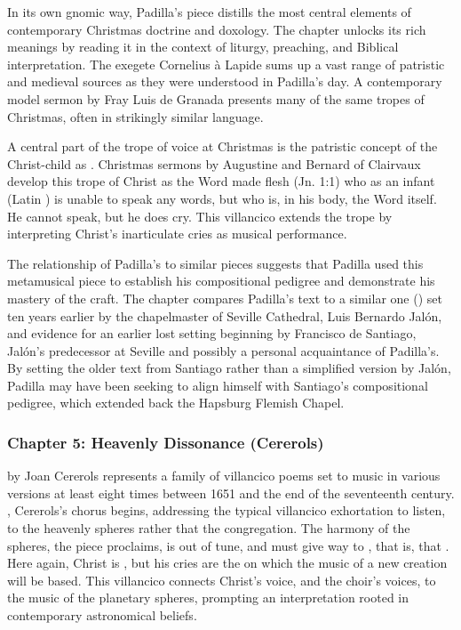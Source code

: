 \documentclass{vcbook-proposal}
\begin{document}
In its own gnomic way, Padilla's piece distills the most central elements of contemporary Christmas doctrine and doxology.
The chapter unlocks its rich meanings by reading it in the context of liturgy, preaching, and Biblical interpretation.
The exegete Cornelius à Lapide sums up a vast range of patristic and medieval sources as they were understood in Padilla's day. 
A contemporary model sermon by Fray Luis de Granada presents many of the same tropes of Christmas, often in strikingly similar language.

A central part of the trope of voice at Christmas is the patristic concept of the Christ-child as . 
Christmas sermons by Augustine and Bernard of Clairvaux develop this trope of Christ as the Word made flesh (Jn. 1:1) who as an infant (Latin ) is unable to speak any words, but who is, in his body, the Word itself.
He cannot speak, but he does cry.
This villancico extends the trope by interpreting Christ's inarticulate cries as musical performance.

The relationship of Padilla's  to similar pieces suggests that Padilla used this metamusical piece to establish his compositional pedigree and demonstrate his mastery of the craft.
The chapter compares Padilla's text to a similar one () set ten years earlier by the chapelmaster of Seville Cathedral, Luis Bernardo Jalón, and evidence for an earlier lost setting beginning  by Francisco de Santiago, Jalón's predecessor at Seville and possibly a personal acquaintance of Padilla's.
By setting the older text from Santiago rather than a simplified version by Jalón, Padilla may have been seeking to align himself with Santiago's compositional pedigree, which extended back the Hapsburg Flemish Chapel.


\subsubsection{Chapter 5: Heavenly Dissonance (Cererols)}

 by Joan Cererols represents a family of villancico poems set to music in various versions at least eight times between 1651 and the end of the seventeenth century.
, Cererols's chorus begins, addressing the typical villancico exhortation to listen, to the heavenly spheres rather that the congregation. 
The harmony of the spheres, the piece proclaims, is out of tune, and must give way to , that is,  that .
Here again, Christ is , but his cries are the  on which the music of a new creation will be based.
This villancico connects Christ's voice, and the choir's voices, to the music of the planetary spheres, prompting an interpretation rooted in contemporary astronomical beliefs.
\end{document}
